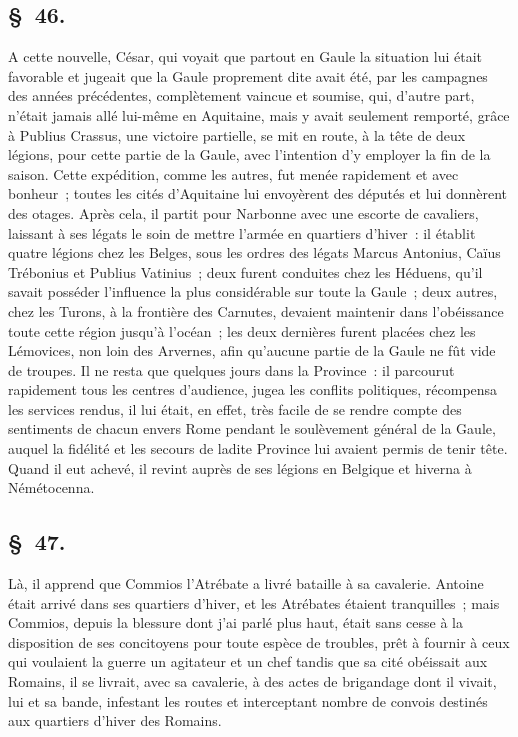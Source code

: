 \documentclass[french,twoside]{book} %
\begin{document}
\subsection[{§ 46.}]{ \textsc{§ 46.} }
\noindent A cette nouvelle, César, qui voyait que partout en Gaule la situation lui était favorable et jugeait que la Gaule proprement dite avait été, par les campagnes des années précédentes, complètement vaincue et soumise, qui, d’autre part, n’était jamais allé lui-même en Aquitaine, mais y avait seulement remporté, grâce à Publius Crassus, une victoire partielle, se mit en route, à la tête de deux légions, pour cette partie de la Gaule, avec l’intention d’y employer la fin de la saison. Cette expédition, comme les autres, fut menée rapidement et avec bonheur ; toutes les cités d’Aquitaine lui envoyèrent des députés et lui donnèrent des otages. Après cela, il partit pour Narbonne avec une escorte de cavaliers, laissant à ses légats le soin de mettre l’armée en quartiers d’hiver : il établit quatre légions chez les Belges, sous les ordres des légats Marcus Antonius, Caïus Trébonius et Publius Vatinius ; deux furent conduites chez les Héduens, qu’il savait posséder l’influence la plus considérable sur toute la Gaule ; deux autres, chez les Turons, à la frontière des Carnutes, devaient maintenir dans l’obéissance toute cette région jusqu’à l’océan ; les deux dernières furent placées chez les Lémovices, non loin des Arvernes, afin qu’aucune partie de la Gaule ne fût vide de troupes. Il ne resta que quelques jours dans la Province : il parcourut rapidement tous les centres d’audience, jugea les conflits politiques, récompensa les services rendus, il lui était, en effet, très facile de se rendre compte des sentiments de chacun envers Rome pendant le soulèvement général de la Gaule, auquel la fidélité et les secours de ladite Province lui avaient permis de tenir tête. Quand il eut achevé, il revint auprès de ses légions en Belgique et hiverna à Némétocenna.
\subsection[{§ 47.}]{ \textsc{§ 47.} }
\noindent Là, il apprend que Commios l’Atrébate a livré bataille à sa cavalerie. Antoine était arrivé dans ses quartiers d’hiver, et les Atrébates étaient tranquilles ; mais Commios, depuis la blessure dont j’ai parlé plus haut, était sans cesse à la disposition de ses concitoyens pour toute espèce de troubles, prêt à fournir à ceux qui voulaient la guerre un agitateur et un chef tandis que sa cité obéissait aux Romains, il se livrait, avec sa cavalerie, à des actes de brigandage dont il vivait, lui et sa bande, infestant les routes et interceptant nombre de convois destinés aux quartiers d’hiver des Romains.
\end{document}
